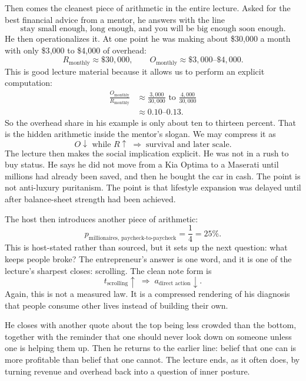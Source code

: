 Then comes the cleanest piece of arithmetic in the entire lecture. Asked for the best financial advice from a mentor, he answers with the line
\[
\text{stay small enough, long enough, and you will be big enough soon enough.}
\]
He then operationalizes it. At one point he was making about \$30{,}000 a month with only \$3{,}000 to \$4{,}000 of overhead:
\begin{equation}
R_{\text{monthly}} \approx \$30{,}000,\qquad
O_{\text{monthly}} \approx \$3{,}000\text{--}\$4{,}000.
\end{equation}
This is good lecture material because it allows us to perform an explicit computation:
\begin{align}
\frac{O_{\text{monthly}}}{R_{\text{monthly}}}
&\approx \frac{3{,}000}{30{,}000}\text{ to }\frac{4{,}000}{30{,}000}\\
&\approx 0.10\text{--}0.13.
\end{align}
So the overhead share in his example is only about ten to thirteen percent. That is the hidden arithmetic inside the mentor's slogan. We may compress it as
\begin{equation}
O \downarrow \text{ while } R \uparrow
\;\Rightarrow\;
\text{survival and later scale}.
\end{equation}
The lecture then makes the social implication explicit. He was not in a rush to buy status. He says he did not move from a Kia Optima to a Maserati until millions had already been saved, and then he bought the car in cash. The point is not anti-luxury puritanism. The point is that lifestyle expansion was delayed until after balance-sheet strength had been achieved.

The host then introduces another piece of arithmetic:
\begin{equation}
p_{\text{millionaires, paycheck-to-paycheck}} = \frac{1}{4}=25\%.
\end{equation}
This is host-stated rather than sourced, but it sets up the next question: what keeps people broke? The entrepreneur's answer is one word, and it is one of the lecture's sharpest closes: scrolling. The clean note form is
\begin{equation}
t_{\text{scrolling}}\uparrow \;\Rightarrow\; a_{\text{direct action}}\downarrow.
\end{equation}
Again, this is not a measured law. It is a compressed rendering of his diagnosis that people consume other lives instead of building their own.

He closes with another quote about the top being less crowded than the bottom, together with the reminder that one should never look down on someone unless one is helping them up. Then he returns to the earlier line: belief that one can is more profitable than belief that one cannot. The lecture ends, as it often does, by turning revenue and overhead back into a question of inner posture.

